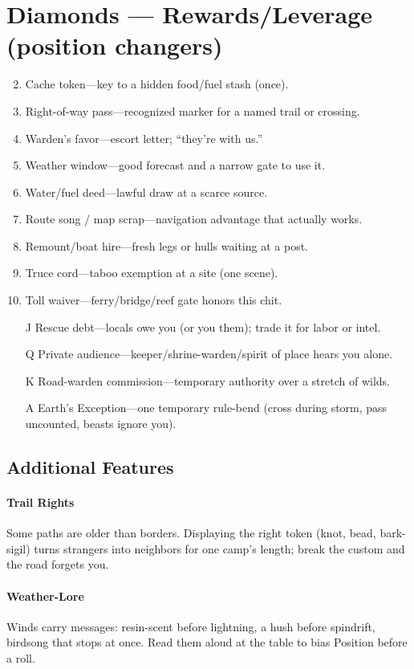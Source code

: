 \section*{Diamonds --- Rewards/Leverage (position changers)}
\label{sec:wilderness-rewards}
\begin{enumerate}
\setcounter{enumi}{1}
\item Cache token---key to a hidden food/fuel stash (once).
\item Right-of-way pass---recognized marker for a named trail or crossing.
\item Warden's favor---escort letter; ``they're with us.''
\item Weather window---good forecast and a narrow gate to use it.
\item Water/fuel deed---lawful draw at a scarce source.
\item Route song / map scrap---navigation advantage that actually works.
\item Remount/boat hire---fresh legs or hulls waiting at a post.
\item Truce cord---taboo exemption at a site (one scene).
\item Toll waiver---ferry/bridge/reef gate honors this chit.
\item[J] Rescue debt---locals owe you (or you them); trade it for labor or intel.
\item[Q] Private audience---keeper/shrine-warden/spirit of place hears you alone.
\item[K] Road-warden commission---temporary authority over a stretch of wilds.
\item[A] Earth's Exception---one temporary rule-bend (cross during storm, pass uncounted, beasts ignore you).
\end{enumerate}

\subsection*{Additional Features}
\label{sec:wilderness-features}

\paragraph{Trail Rights}
Some paths are older than borders. Displaying the right token (knot, bead, bark-sigil) turns strangers into neighbors for one camp’s length; break the custom and the road forgets you.

\paragraph{Weather-Lore}
Winds carry messages: resin-scent before lightning, a hush before spindrift, birdsong that stops at once. Read them aloud at the table to bias Position before a roll.

